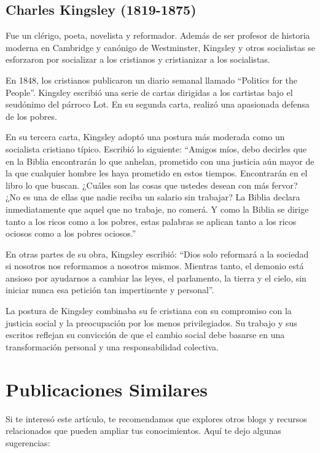 \documentclass[
  jou,
  floatsintext,
  longtable,
  a4paper,
  nolmodern,
  notxfonts,
  notimes,
  12pt,
  colorlinks=true,linkcolor=blue,citecolor=blue,urlcolor=blue]{apa7}
\begin{document}
\subsection{Charles Kingsley
(1819-1875)}\label{charles-kingsley-1819-1875}

Fue un clérigo, poeta, novelista y reformador. Además de ser profesor de
historia moderna en Cambridge y canónigo de Westminster, Kingsley y
otros socialistas se esforzaron por socializar a los cristianos y
cristianizar a los socialistas.

En 1848, los cristianos publicaron un diario semanal llamado ``Politics
for the People''. Kingsley escribió una serie de cartas dirigidas a los
cartistas bajo el seudónimo del párroco Lot. En su segunda carta,
realizó una apasionada defensa de los pobres.

En su tercera carta, Kingsley adoptó una postura más moderada como un
socialista cristiano típico. Escribió lo siguiente: ``Amigos míos, debo
decirles que en la Biblia encontrarán lo que anhelan, prometido con una
justicia aún mayor de la que cualquier hombre les haya prometido en
estos tiempos. Encontrarán en el libro lo que buscan. ¿Cuáles son las
cosas que ustedes desean con más fervor? ¿No es una de ellas que nadie
reciba un salario sin trabajar? La Biblia declara inmediatamente que
aquel que no trabaje, no comerá. Y como la Biblia se dirige tanto a los
ricos como a los pobres, estas palabras se aplican tanto a los ricos
ociosos como a los pobres ociosos.''

En otras partes de su obra, Kingsley escribió: ``Dios solo reformará a
la sociedad si nosotros nos reformamos a nosotros mismos. Mientras
tanto, el demonio está ansioso por ayudarnos a cambiar las leyes, el
parlamento, la tierra y el cielo, sin iniciar nunca esa petición tan
impertinente y personal''.

La postura de Kingsley combinaba su fe cristiana con su compromiso con
la justicia social y la preocupación por los menos privilegiados. Su
trabajo y sus escritos reflejan su convicción de que el cambio social
debe basarse en una transformación personal y una responsabilidad
colectiva.

\section{Publicaciones Similares}\label{publicaciones-similares}

Si te interesó este artículo, te recomendamos que explores otros blogs y
recursos relacionados que pueden ampliar tus conocimientos. Aquí te dejo
algunas sugerencias:
\end{document}
